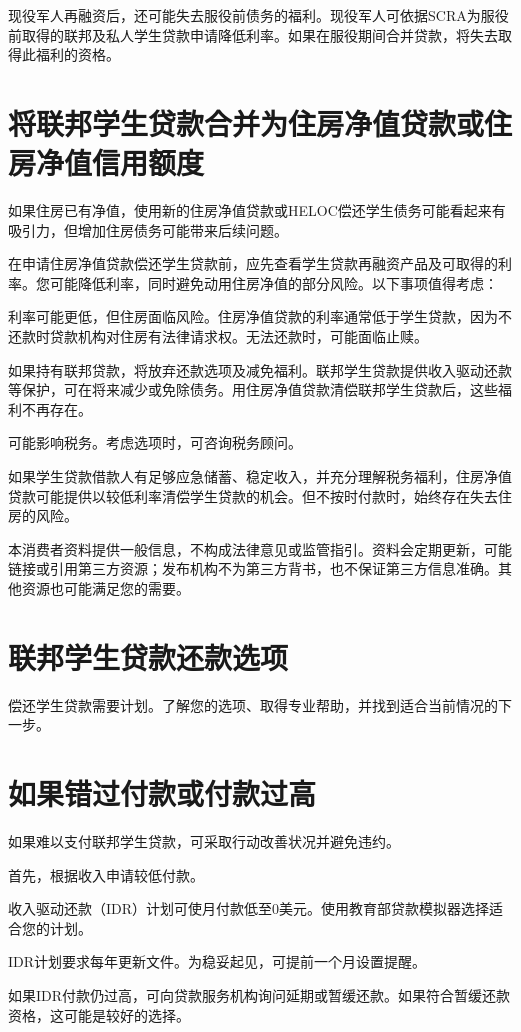 \documentclass[UTF8,fontset=none,11pt,a4paper]{ctexart}
\begin{document}
现役军人再融资后，还可能失去服役前债务的福利。现役军人可依据SCRA为服役前取得的联邦及私人学生贷款申请降低利率。如果在服役期间合并贷款，将失去取得此福利的资格。


\section*{将联邦学生贷款合并为住房净值贷款或住房净值信用额度}
如果住房已有净值，使用新的住房净值贷款或HELOC偿还学生债务可能看起来有吸引力，但增加住房债务可能带来后续问题。


在申请住房净值贷款偿还学生贷款前，应先查看学生贷款再融资产品及可取得的利率。您可能降低利率，同时避免动用住房净值的部分风险。以下事项值得考虑：


利率可能更低，但住房面临风险。住房净值贷款的利率通常低于学生贷款，因为不还款时贷款机构对住房有法律请求权。无法还款时，可能面临止赎。


如果持有联邦贷款，将放弃还款选项及减免福利。联邦学生贷款提供收入驱动还款等保护，可在将来减少或免除债务。用住房净值贷款清偿联邦学生贷款后，这些福利不再存在。


可能影响税务。考虑选项时，可咨询税务顾问。


如果学生贷款借款人有足够应急储蓄、稳定收入，并充分理解税务福利，住房净值贷款可能提供以较低利率清偿学生贷款的机会。但不按时付款时，始终存在失去住房的风险。


本消费者资料提供一般信息，不构成法律意见或监管指引。资料会定期更新，可能链接或引用第三方资源；发布机构不为第三方背书，也不保证第三方信息准确。其他资源也可能满足您的需要。


\section*{联邦学生贷款还款选项}
偿还学生贷款需要计划。了解您的选项、取得专业帮助，并找到适合当前情况的下一步。


\section*{如果错过付款或付款过高}
如果难以支付联邦学生贷款，可采取行动改善状况并避免违约。


首先，根据收入申请较低付款。


收入驱动还款（IDR）计划可使月付款低至0美元。使用教育部贷款模拟器选择适合您的计划。


IDR计划要求每年更新文件。为稳妥起见，可提前一个月设置提醒。


如果IDR付款仍过高，可向贷款服务机构询问延期或暂缓还款。如果符合暂缓还款资格，这可能是较好的选择。
\end{document}
